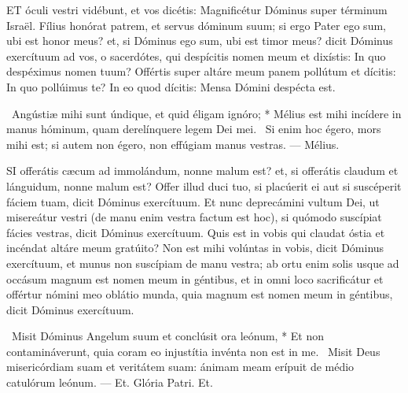 \lettrine[lines=2]{E}{T} óculi vestri vidébunt, et vos dicétis: Magnificétur Dóminus super términum Israël. Fílius honórat patrem, et servus dóminum suum; si ergo Pater ego sum, ubi est honor meus? et, si Dóminus ego sum, ubi est timor meus? dicit Dóminus exercítuum ad vos, o sacerdótes, qui despícitis nomen meum et dixístis: In quo despéximus nomen tuum? Offértis super altáre meum panem pollútum et dícitis: In quo pollúimus te? In eo quod dícitis: Mensa Dómini despécta est.

\R\ Angústiæ mihi sunt úndique, et quid éligam ignóro; * Mélius est mihi incídere in manus hóminum, quam derelínquere legem Dei mei. \V\ Si enim hoc égero, mors mihi est; si autem non égero, non effúgiam manus vestras. — Mélius.



\lettrine[lines=2]{S}{I} offerátis cæcum ad immolándum, nonne malum est? et, si offerátis claudum et lánguidum, nonne malum est? Offer illud duci tuo, si placúerit ei aut si suscéperit fáciem tuam, dicit Dóminus exercítuum. Et nunc deprecámini vultum Dei, ut misereátur vestri (de manu enim vestra factum est hoc), si quómodo suscípiat fácies vestras, dicit Dóminus exercítuum. Quis est in vobis qui claudat óstia et incéndat altáre meum gratúito? Non est mihi volúntas in vobis, dicit Dóminus exercítuum, et munus non suscípiam de manu vestra; ab ortu enim solis usque ad occásum magnum est nomen meum in géntibus, et in omni loco sacrificátur et offértur nómini meo oblátio munda, quia magnum est nomen meum in géntibus, dicit Dóminus exercítuum.

\R\ Misit Dóminus Angelum suum et conclúsit ora leónum, * Et non contamináverunt, quia coram eo injustítia invénta non est in me. \V\ Misit Deus misericórdiam suam et veritátem suam: ánimam meam erípuit de médio catulórum leónum. — Et. Glória Patri. Et.

